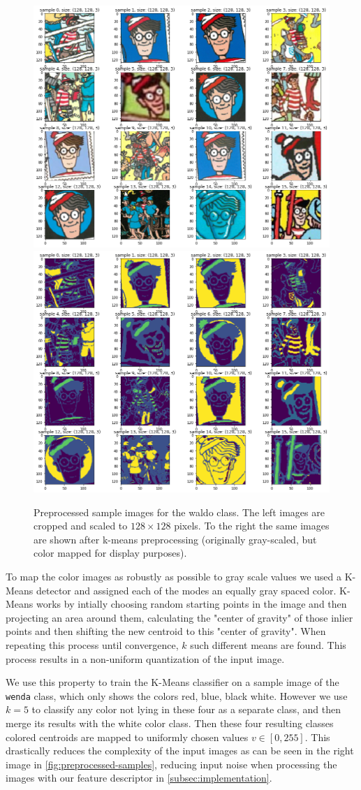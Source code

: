 \documentclass[11pt]{article}
\begin{document}
\begin{figure}
    \centering
    \includegraphics[width=0.4\linewidth]{figures/preprocess_waldo} 
    \hspace{1cm}
    \includegraphics[width=0.4\linewidth]{figures/kmeans_waldo} 
    \caption{Preprocessed sample images for the waldo class. The left images are cropped and scaled to \( 128 \times 128 \) pixels.
    To the right the same images are shown after k-means preprocessing (originally gray-scaled, but color mapped for display purposes).}
    \label{fig:preprocessed-samples}
\end{figure}

To map the color images as robustly as possible to gray scale values we used a K-Means detector 
and assigned each of the modes an equally gray spaced color. 
K-Means works by intially choosing random starting points in the image and then projecting an area around them, calculating the "center of gravity"
of those inlier points and then shifting the new centroid to this "center of gravity". When repeating this
process until convergence, \( k \) such different means are found. This process results in a non-uniform quantization of the input image.

We use this property to train the K-Means classifier on a sample image of the \verb|wenda| class, which only 
shows the colors red, blue, black white. However we use \( k=5 \) to classify any color not lying in these four as a separate class, and then merge 
its results with the white color class. Then these four resulting classes colored centroids are mapped to uniformly
chosen values \( v \in [0, 255] \). This drastically reduces the complexity of the input images as can be seen in the right image in \autoref{fig:preprocessed-samples},
reducing input noise when processing the images with our feature descriptor in \autoref{subsec:implementation}.
\end{document}
